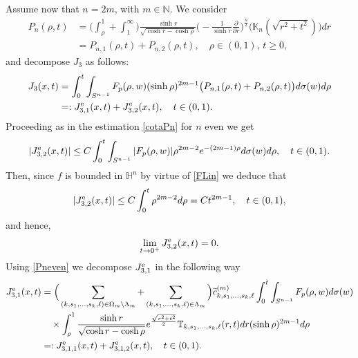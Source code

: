 \documentclass[a4paper,10pt, reqno]{amsart}
\theoremstyle{definition}
\theoremstyle{remark}
\numberwithin{equation}{section}
\begin{document}
{Assume now that $n=2m$, with $m\in \mathbb N$. We consider
\begin{align}\label{PnPn1Pn2}
P_n(\rho ,t)&=\Big(\int_\rho ^1+\int_1^\infty \Big)\frac{\sinh r}{\sqrt{\cosh r-\cosh\rho }}\Big(-\frac{1}{\sinh r}\frac{\partial }{\partial r}\Big)^{\frac{n}{2}}\big(\mathbb K_{n}(\sqrt{r^2+t^2})\big)dr\nonumber\\
&=P_{n,1}(\rho, t)+P_{n,2}(\rho ,t),\quad \rho \in (0,1),\,t\geq 0,
\end{align}
and decompose $J_3$ as follows:
\begin{align*}
J_3(x,t)&=\int_0^t\int_{S^{n-1}}F_p(\rho ,w)(\sinh \rho )^{2m-1}\big(P_{n,1}(\rho, t)+P_{n,2}(\rho ,t)\big)d\sigma(w)d\rho\\
&=:J_{3,1}^{\rm e}(x,t)+J_{3,2}^{\rm e}(x,t),\quad t\in (0,1).
\end{align*}
Proceeding as in the estimation \eqref{cotaPn} for $n$ even we get
$$
|J_{3,2}^{\rm e}(x,t)|\leq C\int_0^t\int_{S^{n-1}}|F_p(\rho , w)|\rho ^{2m-2}e^{-(2m-1)\rho}d\sigma (w)d\rho,\quad t\in (0,1).
$$
Then, since $f$ is bounded in $\mathbb H^n$ by virtue of \eqref{FLin} we deduce that
$$
|J_{3,2}^{\rm e}(x,t)|\leq C\int_0^t\rho ^{2m-2}d\rho =Ct^{2m-1},\quad t\in (0,1),
$$
and hence,
\begin{equation}\label{J32even}
\lim_{t\rightarrow 0^+}J_{3,2}^{\rm e}(x,t)=0.
\end{equation}
Using \eqref{Pneven} we decompose $J_{3,1}^{\rm e}$ in the following way 
\begin{align*}
J_{3,1}^{\rm e}(x,t)&=\Big(\sum_{(k,s_1,\ldots,s_k,\ell)\in \Omega_m\setminus \Lambda _m}+\sum_{(k,s_1,\ldots, s_k,\ell)\in \Lambda _m}\Big)\widetilde{c}_{k,s_1,\ldots, s_k,\ell}^{(m)}\int_0^t\int_{S^{n-1}}F_p(\rho , w)d\sigma(w)\\
&\quad \times\int_\rho ^1\frac{\sinh r}{\sqrt{\cosh r -\cosh \rho}}e^{\frac{\sqrt{r^2+t^2}}{2}}\mathbb T_{k,s_1,\ldots,s_k,\ell}(r, t)dr(\sinh \rho )^{2m-1}d\rho\\
&=:J_{3,1,1}^{\rm e}(x,t)+J_{3,1,2}^{\rm e}(x,t),\quad t\in (0,1).
\end{align*}

}
\end{document}
